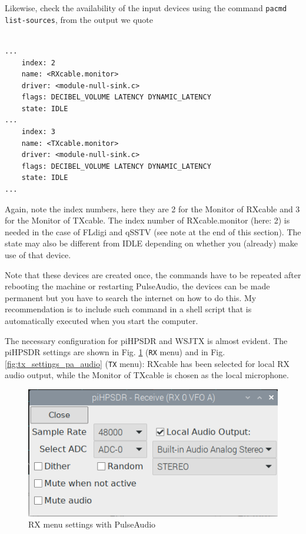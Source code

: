 \documentclass[12pt]{book}
\def\bltt#1{\texttt{\color{blue}#1}}
\def\pH{pi\-HPSDR\xspace}
\begin{document}
Likewise, check the availability of the input devices using
the command \texttt{pacmd list-sources}, from the output we quote

\begin{small}
\begin{verbatim}

...
    index: 2
	name: <RXcable.monitor>
	driver: <module-null-sink.c>
	flags: DECIBEL_VOLUME LATENCY DYNAMIC_LATENCY
	state: IDLE
...
    index: 3
	name: <TXcable.monitor>
	driver: <module-null-sink.c>
	flags: DECIBEL_VOLUME LATENCY DYNAMIC_LATENCY
	state: IDLE
...
\end{verbatim}
\end{small}

Again, note the index numbers, here they are 2 for the Monitor of RXcable and 3 for the Monitor
of TXcable. The index number of RXcable.monitor (here: 2) is needed in the
case of FLdigi and qSSTV (see note at the end of this section).
The state may also be different from IDLE depending on whether
you (already) make use of that device.

Note that these devices are created once, the commands have to be repeated after rebooting
the machine or restarting PulseAudio, the devices can be made permanent but you have to
search the internet on how to do this. My recommendation is to include such command in a
shell script that is automatically executed when you start the computer.

The necessary configuration for \pH and WSJTX is  almost evident. The
\pH settings are shown in Fig. \ref{fig:rx_settings_pa_audio} (\bltt{RX} menu)
and in Fig. \ref{fig:tx_settings_pa_audio} (\bltt{TX} menu): RXcable has been selected
for local RX audio output, while the Monitor of TXcable is chosen as the local
microphone.

\begin{figure}[ht]
\center
\includegraphics[width=12cm]{rx_settings_pa_audio.png}
\caption{RX menu settings with PulseAudio}
\label{fig:rx_settings_pa_audio}
\end{figure}
\end{document}

